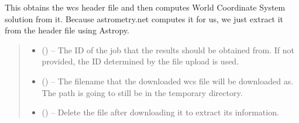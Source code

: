 \documentclass[letterpaper,11pt,english]{sphinxmanual}
\begin{document}
\begin{savenotes}
\begin{fulllineitems}
\begin{savenotes}\begin{fulllineitems}
\label{\detokenize{code/opihiexarata.astrometry.webclient:opihiexarata.astrometry.webclient.AstrometryNetWebAPIEngine.get_wcs}}
\pysigstartsignatures
{}
\pysigstopsignatures
\sphinxAtStartPar
This obtains the wcs header file and then computes World Coordinate
System solution from it. Because astrometry.net computes it for us,
we just extract it from the header file using Astropy.
\begin{quote}\begin{description}
\begin{itemize}
\item {} 
\sphinxAtStartPar
{} (\sphinxstyleliteralemphasis{\sphinxupquote{, }}) – The ID of the job that the results should be obtained from. If not
provided, the ID determined by the file upload is used.

\item {} 
\sphinxAtStartPar
{} (\sphinxstyleliteralemphasis{\sphinxupquote{, }}) – The filename that the downloaded wcs file will be downloaded as.
The path is going to still be in the temporary directory.

\item {} 
\sphinxAtStartPar
{} (\sphinxstyleliteralemphasis{\sphinxupquote{, }}) – Delete the file after downloading it to extract its information.

\end{itemize}


\end{description}
\end{quote}
\end{fulllineitems}
\end{savenotes}
\end{fulllineitems}
\end{savenotes}
\end{document}
